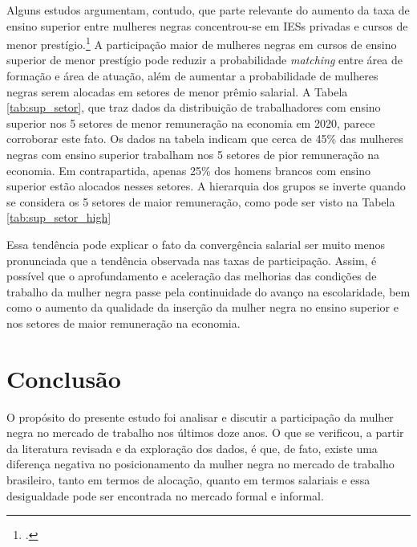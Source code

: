 \documentclass[12pt]{article}
\begin{document}
\par Alguns estudos argumentam, contudo, que parte relevante do aumento da taxa de ensino superior entre mulheres negras concentrou-se em IESs privadas e cursos de menor prestígio.\footcite[Cap. 1]{marcondes2013dossie} A participação maior de mulheres negras em cursos de ensino superior de menor prestígio pode reduzir a probabilidade \textit{matching} entre área de formação e área de atuação, além de aumentar a probabilidade de mulheres negras serem alocadas em setores de menor prêmio salarial. A Tabela \ref{tab:sup_setor}, que traz dados da distribuição de trabalhadores com ensino superior nos 5 setores de menor remuneração na economia em 2020, parece corroborar este fato. Os dados na tabela indicam que cerca de 45\% das mulheres negras com ensino superior trabalham nos 5 setores de pior remuneração na economia. Em contrapartida, apenas 25\% dos homens brancos com ensino superior estão alocados nesses setores. A hierarquia dos grupos se inverte quando se considera os 5 setores de maior remuneração, como pode ser visto na Tabela \ref{tab:sup_setor_high}








\par Essa tendência pode explicar o fato da convergência salarial ser muito menos pronunciada que a tendência observada nas taxas de participação. Assim, é possível que o aprofundamento e aceleração das melhorias das condições de trabalho da mulher negra passe pela continuidade do avanço na escolaridade, bem como o aumento da qualidade da inserção da mulher negra no ensino superior e nos setores de maior remuneração na economia.

\section{Conclusão}

\par O propósito do presente estudo foi analisar e discutir a participação da mulher negra no mercado de trabalho nos últimos doze anos. O que se verificou, a partir da literatura revisada e da exploração dos dados, é que, de fato, existe uma diferença negativa no posicionamento da mulher negra no mercado de trabalho brasileiro, tanto em termos de alocação, quanto em termos salariais e essa desigualdade pode ser encontrada no mercado formal e informal.
\end{document}
